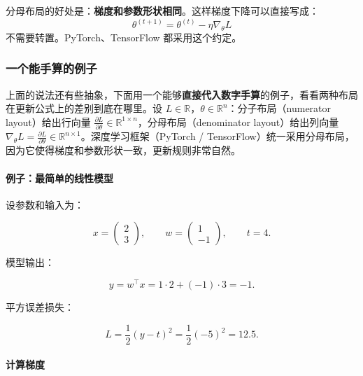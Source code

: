 分母布局的好处是：\textbf{梯度和参数形状相同}。这样梯度下降可以直接写成：
\begin{equation}
\theta^{(t+1)} = \theta^{(t)} - \eta \nabla_\theta L
\end{equation}
不需要转置。PyTorch、TensorFlow 都采用这个约定。



\subsubsection*{一个能手算的例子}

上面的说法还有些抽象，下面用一个能够\textbf{直接代入数字手算}的例子，看看两种布局在更新公式上的差别到底在哪里。设 $L \in \mathbb{R}$，$\theta \in \mathbb{R}^n$：分子布局（numerator layout）给出行向量 $\frac{\partial L}{\partial \theta} \in \mathbb{R}^{1 \times n}$，分母布局（denominator layout）给出列向量 $\nabla_\theta L = \frac{\partial L}{\partial \theta} \in \mathbb{R}^{n \times 1}$。深度学习框架（PyTorch / TensorFlow）统一采用分母布局，因为它使得梯度和参数形状一致，更新规则非常自然。

\paragraph{例子：最简单的线性模型}

设参数和输入为：

\[
x=\begin{pmatrix}2 \\ 3\end{pmatrix},\qquad 
w=\begin{pmatrix}1 \\ -1\end{pmatrix},\qquad 
t=4.
\]

模型输出：

\[
y = w^\top x = 1\cdot 2 + (-1)\cdot 3 = -1.
\]

平方误差损失：

\[
L=\frac12 (y - t)^2 = \frac12(-5)^2 = 12.5.
\]

\paragraph{计算梯度}

